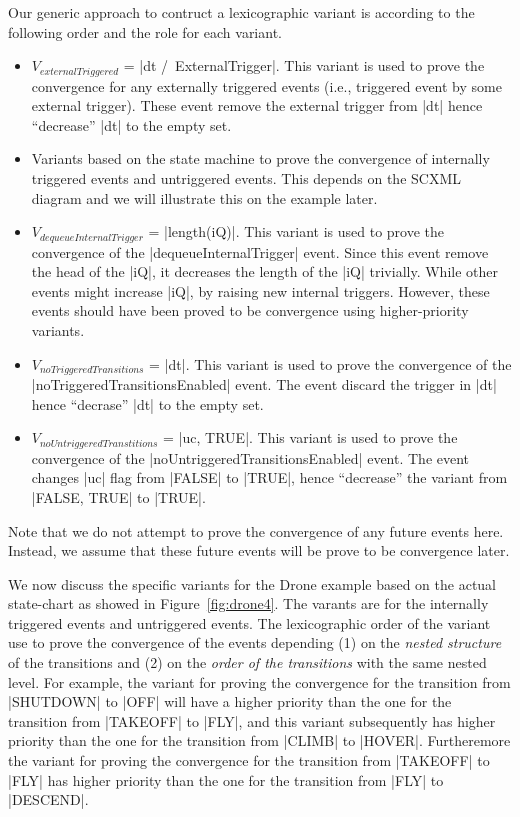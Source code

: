 Our generic approach to contruct a lexicographic variant is according
to the following order and the role for each variant.
\begin{itemize}
\item $V_{externalTriggered}$ = |dt /\ ExternalTrigger|.  This variant
  is used to prove the convergence for any externally triggered events
  (i.e., triggered event by some external trigger). These event remove
  the external trigger from |dt| hence ``decrease'' |dt| to the empty
  set.

\item Variants based on the state machine to prove the convergence of
  internally triggered events and untriggered events.  This depends on
  the SCXML diagram and we will illustrate this on the example later.
  
\item $V_{dequeueInternalTrigger}$ = |length(iQ)|.  This variant is
  used to prove the convergence of the |dequeueInternalTrigger| event.
  Since this event remove the head of the |iQ|, it decreases the
  length of the |iQ| trivially.  While other events might increase
  |iQ|, by raising new internal triggers. However, these events should
  have been proved to be convergence using higher-priority variants.
  
\item $V_{noTriggeredTransitions}$ = |dt|.  This variant is used to
  prove the convergence of the |noTriggeredTransitionsEnabled| event.
  The event discard the trigger in |dt| hence ``decrase'' |dt| to the
  empty set.
  
\item $V_{noUntriggeredTranstitions}$ = |{uc, TRUE}|.  This variant is
  used to prove the convergence of the
  |noUntriggeredTransitionsEnabled| event.  The event changes |uc|
  flag from |FALSE| to |TRUE|, hence ``decrease'' the variant from
  |{FALSE, TRUE}| to |{TRUE}|.
\end{itemize}
Note that we do not attempt to prove the convergence of any future
events here. Instead, we assume that these future events will be prove
to be convergence later.

We now discuss the specific variants for the Drone example based on
the actual state-chart as showed in Figure~\ref{fig:drone4}.  The
varants are for the internally triggered events and untriggered
events. The lexicographic order of the variant use to prove the
convergence of the events depending (1) on the \emph{nested structure}
of the transitions and (2) on the \emph{order of the transitions} with
the same nested level.  For example, the variant for proving the
convergence for the transition from |SHUTDOWN| to |OFF| will have a
higher priority than the one for the transition from |TAKEOFF| to
|FLY|, and this variant subsequently has higher priority than the one
for the transition from |CLIMB| to |HOVER|.  Furtheremore the variant
for proving the convergence for the transition from |TAKEOFF| to |FLY|
has higher priority than the one for the transition from |FLY| to
|DESCEND|.

